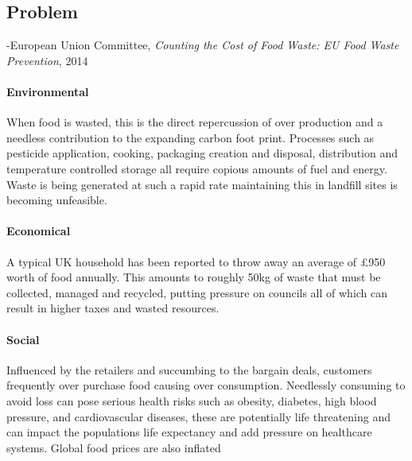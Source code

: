 \documentclass[a4paper, 11pt]{article}
\begin{document}
\vspace{\baselineskip}
\vspace{\baselineskip}
\vspace{\baselineskip}

\subsection{Problem}




\begin{quoting}
-European Union Committee, \emph{Counting the Cost of Food Waste: EU Food Waste Prevention}, 2014\cite{FoodWaste}
\end{quoting}

\paragraph{Environmental}When food is wasted, this is the direct repercussion of over production and a needless contribution to the expanding carbon foot print. Processes such as pesticide application, cooking, packaging creation and disposal, distribution and temperature controlled storage all require copious amounts of fuel and energy. Waste is being generated at such a rapid rate maintaining this in landfill sites is becoming unfeasible.\cite{waste}

\paragraph{Economical}A typical UK household has been reported to throw away an average of \pounds950 worth of food annually. This amounts to roughly 50kg of waste that must be collected, managed and recycled, putting pressure on councils all of which can result in higher taxes and wasted resources.\cite{FoodWaste}

\paragraph{Social} Influenced by the retailers and succumbing to the bargain deals, customers frequently over purchase food causing over consumption. Needlessly consuming to avoid loss can pose serious health risks such as obesity, diabetes, high blood pressure, and cardiovascular diseases, these are potentially life threatening and can impact the populations life expectancy and add pressure on healthcare systems. Global food prices are also inflated\cite{obesity}
\end{document}
